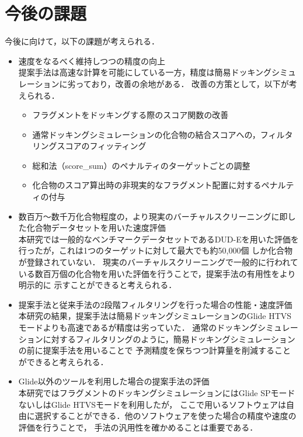 \section{今後の課題}
今後に向けて，以下の課題が考えられる．
\begin{itemize}
\item 速度をなるべく維持しつつの精度の向上\\
	提案手法は高速な計算を可能にしている一方，精度は簡易ドッキングシミュレーションに劣っており，改善の余地がある．
	改善の方策として，以下が考えられる．
	\begin{itemize}
	\item フラグメントをドッキングする際のスコア関数の改善
	\item 通常ドッキングシミュレーションの化合物の結合スコアへの，フィルタリングスコアのフィッティング
	\item 総和法（score\_sum）のペナルティのターゲットごとの調整
	\item 化合物のスコア算出時の非現実的なフラグメント配置に対するペナルティの付与
	\end{itemize}
\item 数百万～数千万化合物程度の，より現実のバーチャルスクリーニングに即した化合物データセットを用いた速度評価\\
	本研究では一般的なベンチマークデータセットであるDUD-Eを用いた評価を行ったが，これは1つのターゲットに対して最大でも約50,000個
	しか化合物が登録されていない．
	現実のバーチャルスクリーニングで一般的に行われている数百万個の化合物を用いた評価を行うことで，提案手法の有用性をより明示的に
	示すことができると考えられる．
\item 提案手法と従来手法の2段階フィルタリングを行った場合の性能・速度評価\\
	本研究の結果，提案手法は簡易ドッキングシミュレーションのGlide HTVSモードよりも高速であるが精度は劣っていた．
	通常のドッキングシミュレーションに対するフィルタリングのように，簡易ドッキングシミュレーションの前に提案手法を用いることで
	予測精度を保ちつつ計算量を削減することができると考えられる．
\item Glide以外のツールを利用した場合の提案手法の評価\\
	本研究ではフラグメントのドッキングシミュレーションにはGlide SPモードないしはGlide HTVSモードを利用したが，
	ここで用いるソフトウェアは自由に選択することができる．他のソフトウェアを使った場合の精度や速度の評価を行うことで，
	手法の汎用性を確かめることは重要である．
\end{itemize}
